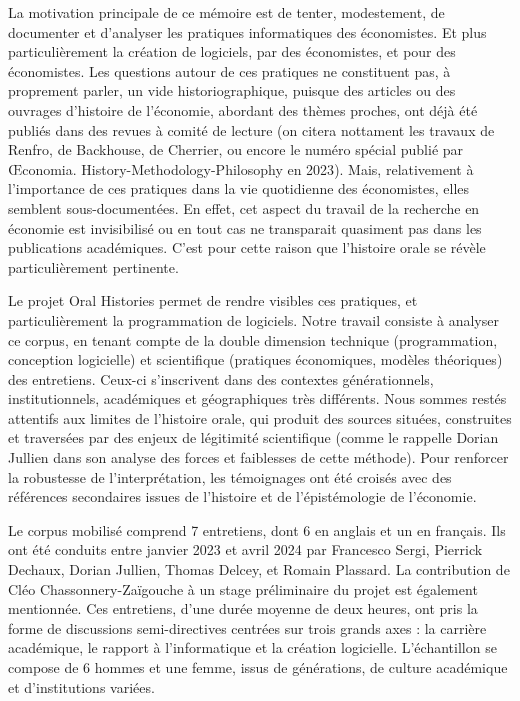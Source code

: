 La motivation principale de ce mémoire est de tenter, modestement, de documenter et d'analyser les pratiques informatiques des économistes. Et plus particulièrement la création de logiciels, par des économistes, et pour des économistes. Les questions autour de ces pratiques ne constituent pas, à proprement parler, un vide historiographique, puisque des articles ou des ouvrages d'histoire de l'économie, abordant des thèmes proches, ont déjà été publiés dans des revues à comité de lecture (on citera nottament les travaux de Renfro, de Backhouse, de Cherrier, ou encore le numéro spécial publié par Œconomia. History-Methodology-Philosophy en 2023\cite{boumansComputerizationEconomicsThree2023}). Mais, relativement à l'importance de ces pratiques dans la vie quotidienne des économistes, elles semblent sous-documentées. En effet, cet aspect du travail de la recherche en économie est invisibilisé ou en tout cas ne transparait quasiment pas dans les publications académiques. C'est pour cette raison que l'histoire orale se révèle particulièrement pertinente. 

Le projet Oral Histories permet de rendre visibles ces pratiques, et particulièrement la programmation de logiciels. Notre travail consiste à analyser ce corpus, en tenant compte de la double dimension technique (programmation, conception logicielle) et scientifique (pratiques économiques, modèles théoriques) des entretiens. Ceux-ci s’inscrivent dans des contextes générationnels, institutionnels, académiques et géographiques très différents. Nous sommes restés attentifs aux limites de l’histoire orale, qui produit des sources situées, construites et traversées par des enjeux de légitimité scientifique (comme le rappelle Dorian Jullien dans son analyse des forces et faiblesses de cette méthode). Pour renforcer la robustesse de l’interprétation, les témoignages ont été croisés avec des références secondaires issues de l’histoire et de l’épistémologie de l’économie.


Le corpus mobilisé comprend 7 entretiens, dont 6 en anglais et un en français. Ils ont été conduits entre janvier 2023 et avril 2024 par Francesco Sergi, Pierrick Dechaux, Dorian Jullien, Thomas Delcey, et Romain Plassard. La contribution de Cléo Chassonnery-Zaïgouche à un stage préliminaire du projet est également mentionnée. Ces entretiens, d’une durée moyenne de deux heures, ont pris la forme de discussions semi-directives centrées sur trois grands axes : la carrière académique, le rapport à l’informatique et la création logicielle. L’échantillon se compose de 6 hommes et une femme, issus de générations, de culture académique et d’institutions variées.

